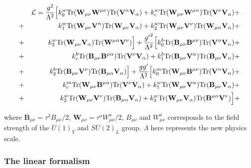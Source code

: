 \begin{eqnarray}
&& {\cal L} = \dfrac{g^2}{\Lambda^{2}}
\Big[ k_0^w \mbox{Tr}(\mathbf{W}_{\mu\nu}\mathbf{W}^{\mu\nu})\mbox{Tr}(\mathbf{V}^{\alpha}\mathbf{V}_{\alpha}) +
      k_c^w \mbox{Tr}(\mathbf{W}_{\mu\nu}\mathbf{W}^{\mu\alpha})\mbox{Tr}(\mathbf{V}^{\nu}\mathbf{V}_{\alpha}) + \nonumber \\
&+&   k_1^w \mbox{Tr}(\mathbf{W}_{\mu\nu}\mathbf{V}^{\alpha})\mbox{Tr}(\mathbf{W}_{\mu\nu}\mathbf{V}_{\alpha}) +
      k_2^w \mbox{Tr}(\mathbf{W}_{\mu\nu}\mathbf{V}^{\nu})\mbox{Tr}(\mathbf{W}_{\mu\alpha}\mathbf{V}_{\alpha}) + \nonumber \\
&+&   k_3^w \mbox{Tr}(\mathbf{W}_{\mu\nu}\mathbf{V}_{\alpha})\mbox{Tr}(\mathbf{W}^{\mu\alpha}\mathbf{V}^{\nu}) \Big] +
      \dfrac{{g'}^2}{\Lambda^{2}}
\Big[ k_0^b \mbox{Tr}(\mathbf{B}_{\mu\nu}\mathbf{B}^{\mu\nu})\mbox{Tr}(\mathbf{V}^{\alpha}\mathbf{V}_{\alpha}) + \nonumber \\
&+&   k_c^b \mbox{Tr}(\mathbf{B}_{\mu\nu}\mathbf{B}^{\mu\alpha})\mbox{Tr}(\mathbf{V}^{\nu}\mathbf{V}_{\alpha}) +
      k_1^b \mbox{Tr}(\mathbf{B}_{\mu\nu}\mathbf{V}^{\alpha})\mbox{Tr}(\mathbf{B}_{\mu\nu}\mathbf{V}_{\alpha}) + \nonumber \\
&+&   k_2^b \mbox{Tr}(\mathbf{B}_{\mu\nu}\mathbf{V}^{\nu})\mbox{Tr}(\mathbf{B}_{\mu\alpha}\mathbf{V}_{\alpha}) \Big] +
      \dfrac{g g'}{\Lambda^{2}}
\Big[ k_0^m \mbox{Tr}(\mathbf{W}_{\mu\nu}\mathbf{B}^{\mu\nu})\mbox{Tr}(\mathbf{V}^{\alpha}\mathbf{V}_{\alpha}) + \nonumber \\
&+&   k_c^m \mbox{Tr}(\mathbf{W}_{\mu\nu}\mathbf{B}^{\mu\alpha})\mbox{Tr}(\mathbf{V}^{\nu}\mathbf{V}_{\alpha}) +
      k_1^w \mbox{Tr}(\mathbf{W}_{\mu\nu}\mathbf{V}^{\alpha})\mbox{Tr}(\mathbf{B}_{\mu\nu}\mathbf{V}_{\alpha}) + \nonumber \\
&+&   k_2^w \mbox{Tr}(\mathbf{W}_{\mu\nu}\mathbf{V}^{\nu})\mbox{Tr}(\mathbf{B}_{\mu\alpha}\mathbf{V}_{\alpha}) +
      k_3^w \mbox{Tr}(\mathbf{W}_{\mu\nu}\mathbf{V}_{\alpha})\mbox{Tr}(\mathbf{B}^{\mu\alpha}\mathbf{V}^{\nu}) \Big] + \nonumber \\
\label{dim6:14}
\end{eqnarray}

where $\mathbf{B}_{\mu \nu} = \tau^3 B_{\mu \nu} / 2$,
$\mathbf{W}_{\mu\nu} = \tau^a W_{\mu\nu}^a / 2$, $B_{\mu \nu}$ and
$W_{\mu\nu}^a$ corresponds to the field strength of the $U(1)_Y$ and
$SU(2)_L$ group. $\Lambda$ here represents the new physics scale.

\subsubsection{The linear formalism}

